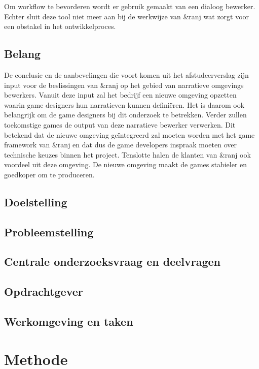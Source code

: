 \documentclass{report}
\newcommand{\organisation}{\&ranj }
\begin{document}
Om workflow te bevorderen wordt er gebruik gemaakt van een dialoog bewerker\cite{interviewivo}. Echter sluit deze tool niet meer aan bij de werkwijze van \organisation \cite{interviewivo} wat zorgt voor een obstakel in het ontwikkelproces.

\section{Belang}
De conclusie en de aanbevelingen die voort komen uit het afstudeerverslag zijn input voor de beslissingen van \organisation op het gebied van narratieve omgevings bewerkers. Vanuit deze input zal het bedrijf een nieuwe omgeving opzetten waarin game designers hun narratieven kunnen definiëren. Het is daarom ook belangrijk om de game designers bij dit onderzoek te betrekken. Verder zullen toekomstige games de output van deze narratieve bewerker verwerken. Dit betekend dat de nieuwe omgeving geïntegreerd zal moeten worden met het game framework van \organisation en dat dus de game developers inspraak moeten over technische keuzes binnen het project. Tenslotte halen de klanten van \organisation ook voordeel uit deze omgeving. De nieuwe omgeving maakt de games stabieler en goedkoper om te produceren.

\section{Doelstelling}

\section{Probleemstelling}

\section{Centrale onderzoeksvraag en deelvragen}

\section{Opdrachtgever}

\section{Werkomgeving en taken}


\chapter{Methode}
\end{document}
